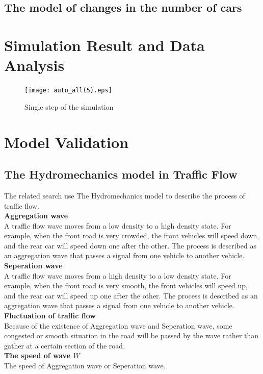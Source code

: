 \documentclass{mcmthesis}
\begin{document}
\subsection{The model of changes in the number of cars}
\label{changes of cars}
 
\section{Simulation Result and Data Analysis}
\begin{figure}[H]
	\centerline{\texttt{[image: auto\_all(5).eps]}}
	\caption{Single step of the simulation}
\end{figure}
\section{Model Validation}
\subsection{The Hydromechanics model in Traffic Flow}
	The related search use The Hydromechanics model to describe the process of traffic flow.\\
\indent\textbf{Aggregation wave}\\
\indent	A traffic flow wave moves from a low density to a high density state. For example, when the front road is very crowded, the front vehicles will speed down, and the rear car will speed down one after the other. The process is described as an aggregation wave that passes a signal from one vehicle to another vehicle.\\
\indent \textbf{Seperation wave}\\
\indent	A traffic flow wave moves from a high density to a low density state. For example, when the front road is very smooth, the front vehicles will speed up, and the rear car will speed up one after the other. The process is described as an aggregation wave that passes a signal from one vehicle to another vehicle.\\
\indent \textbf{Fluctuation of traffic flow}\\
\indent		Because of the existence of Aggregation wave and Seperation wave, some congested or smooth situation in the road will be passed by the wave rather than gather at a certain section of the road.\\
\indent \textbf{The speed of wave $W$}\\
\indent	The speed of Aggregation wave or Seperation wave.\\
\end{document}
